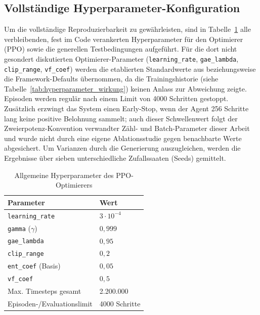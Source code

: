 \documentclass[
  a4paper,
  11pt,
  twoside,
  BCOR=8mm,           %
  headings=big,
  numbers=noenddot,
  listof=totoc,       %
  captions=tableheading,
]{scrreprt}
\begin{document}
\subsection{Vollständige Hyperparameter-Konfiguration}
\label{sec:impl_rl_parameter}
Um die vollständige Reproduzierbarkeit zu gewährleisten, sind in Tabelle~\ref{tab:parameter_training} alle verbleibenden, fest im Code verankerten Hyperparameter für den Optimierer (PPO) sowie die generellen Testbedingungen aufgeführt. Für die dort nicht gesondert diskutierten Optimierer-Parameter (\texttt{learning\_rate}, \texttt{gae\_lambda}, \texttt{clip\_range}, \texttt{vf\_coef}) werden die etablierten Standardwerte aus \citet{schulman2017proximal} beziehungsweise die Framework-Defaults übernommen, da die Trainingshistorie (siehe Tabelle~\ref{tab:hyperparameter_wirkung}) keinen Anlass zur Abweichung zeigte. Episoden werden regulär nach einem Limit von 4000 Schritten gestoppt. Zusätzlich erzwingt das System einen Early-Stop, wenn der Agent 256 Schritte lang keine positive Belohnung sammelt; auch dieser Schwellenwert folgt der Zweierpotenz-Konvention verwandter Zähl- und Batch-Parameter dieser Arbeit und wurde nicht durch eine eigene Ablationsstudie gegen benachbarte Werte abgesichert. Um Varianzen durch die Generierung auszugleichen, werden die Ergebnisse über sieben unterschiedliche Zufallssaaten (Seeds) gemittelt.

\begin{table}[htbp]
    \centering
    \caption{Allgemeine Hyperparameter des PPO-Optimierers}
    \label{tab:parameter_training}
    \begin{tabular}{p{4.5cm}p{9.0cm}}
        \toprule
        \textbf{Parameter} & \textbf{Wert} \\
        \midrule
        \texttt{learning\_rate} & $3 \cdot 10^{-4}$ \\
        \texttt{gamma} ($\gamma$) & $0{,}999$ \\
        \texttt{gae\_lambda} & $0{,}95$ \\
        \texttt{clip\_range} & $0{,}2$ \\
        \texttt{ent\_coef} (Basis) & $0{,}05$ \\
        \texttt{vf\_coef} & $0{,}5$ \\
        Max. Timesteps gesamt & 2.200.000 \\
        Episoden-/Evaluationslimit & 4000 Schritte \\
        \bottomrule
    \end{tabular}
\end{table}
\end{document}
